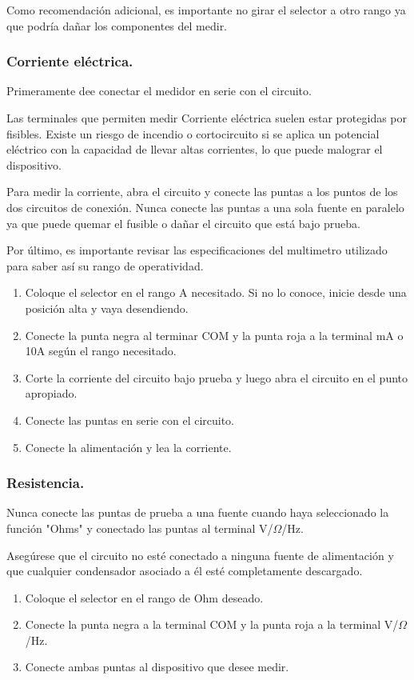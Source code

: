 \documentclass[10pt]{article}
\begin{document}
\begin{multicols}{2}
Como recomendación adicional, es importante no girar el selector a otro rango ya que podría dañar los componentes del medir.
\subsubsection{Corriente eléctrica.}

Primeramente dee conectar el medidor en serie con el circuito.

Las terminales que permiten medir Corriente eléctrica suelen estar protegidas por fisibles. Existe un riesgo de incendio o cortocircuito si se aplica un potencial eléctrico con la capacidad de llevar altas corrientes, lo que puede malograr el dispositivo.

Para medir la corriente, abra el circuito y conecte las puntas a los puntos de los dos circuitos de conexión. Nunca conecte las puntas a una sola fuente en paralelo ya que puede quemar el fusible o dañar el circuito que está bajo prueba.

Por último, es importante revisar las especificaciones del multimetro utilizado para saber así su rango de operatividad.

\begin{enumerate}
	\item Coloque el selector en el rango A necesitado. Si no lo conoce, inicie desde una posición alta y vaya desendiendo.
	\item Conecte la punta negra al terminar COM y la punta roja a la terminal mA o 10A según el rango necesitado.
	\item Corte la corriente del circuito bajo prueba y luego abra el circuito en el punto apropiado.
	\item Conecte las puntas en serie con el circuito. 
	\item Conecte la alimentación y lea la corriente.
\end{enumerate}
\subsubsection{Resistencia.}

Nunca conecte las puntas de prueba a una fuente cuando haya seleccionado la función "Ohms" y conectado las puntas al terminal V/$\Omega$/Hz.

Asegúrese que el circuito no esté conectado a ninguna fuente de alimentación y que cualquier condensador asociado a él esté completamente descargado.

\begin{enumerate}
	\item Coloque el selector en el rango de Ohm deseado.
	\item Conecte la punta negra a la terminal COM y la punta roja a la terminal V/$\Omega$/Hz.
	\item Conecte ambas puntas al dispositivo que desee medir.
\end{enumerate}


\end{multicols}
\end{document}
